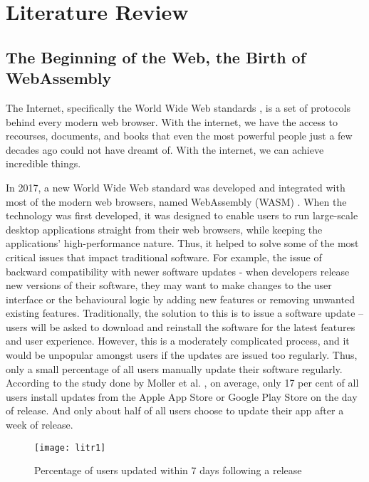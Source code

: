 \chapter{Literature Review} \label{chap:litreview}

\bigskip
\section{The Beginning of the Web, the Birth of WebAssembly}

The Internet, specifically the World Wide Web standards \cite{lit1}, is a set of protocols behind every modern web browser. With the internet, we have the access to recourses, documents, and books that even the most powerful people just a few decades ago could not have dreamt of. With the internet, we can achieve incredible things.

In 2017, a new World Wide Web standard was developed and integrated with most of the modern web browsers, named WebAssembly (WASM) \cite{lit2}. When the technology was first developed, it was designed to enable users to run large-scale desktop applications straight from their web browsers, while keeping the applications’ high-performance nature. Thus, it helped to solve some of the most critical issues that impact traditional software. For example, the issue of backward compatibility with newer software updates - when developers release new versions of their software, they may want to make changes to the user interface or the behavioural logic by adding new features or removing unwanted existing features. Traditionally, the solution to this is to issue a software update – users will be asked to download and reinstall the software for the latest features and user experience. However, this is a moderately complicated process, and it would be unpopular amongst users if the updates are issued too regularly. Thus, only a small percentage of all users manually update their software regularly. According to the study done by Moller et al. \cite{lit3}, on average, only 17 per cent of all users install updates from the Apple App Store \cite{lit4} or Google Play Store \cite{lit5} on the day of release. And only about half of all users choose to update their app after a week of release.

\newpage
\bigskip
\begin{figure}[hp]
\centering
\texttt{[image: litr1]}
\caption{\footnotesize{Percentage of users updated within 7 days following a release \cite{lit3}}}
\captionsetup{aboveskip=0pt,font=it}
\end{figure}
\bigskip

